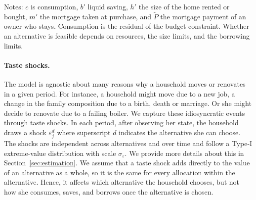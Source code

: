\begin{table}[!htbp]
\begin{threeparttable}
\begin{tabularx}{\textwidth}{@{}Xc@{}}
      \bottomrule\bottomrule
    \end{tabularx}
    \begin{tablenotes}[flushleft]\footnotesize
      \item Notes: $c$ is consumption, $b'$ liquid saving, $h'$ the size of
      the home rented or bought, $m'$ the mortgage taken at purchase, and
      $\widetilde P$ the mortgage payment of an owner who stays. Consumption is
      the residual of the budget constraint. Whether an alternative is
      feasible depends on resources, the size limits, and the borrowing
      limits.
    \end{tablenotes}
  \end{threeparttable}
\end{table}


\paragraph{Taste shocks.}
The model is agnostic about many reasons why a household moves or renovates in a
given period. For instance, a household might move due to a new job, a change in the family composition due to a birth, death or marriage. Or she might decide to renovate due to a  failing boiler. We capture these idiosyncratic events through taste shocks. In each period, after observing her state, the household draws a shock $\varepsilon_j^d$ where superscript $d$ indicates the alternative she can choose. The shocks are independent across alternatives and over time and follow a
Type-I extreme-value distribution with scale $\sigma_\varepsilon$. We provide more details about this in  Section~\ref{sec:estimation}. We assume that a taste shock adds directly to the value of an
alternative as a whole, so it is the same for every allocation within the alternative. Hence, it affects which alternative the household chooses, but not how she consumes, saves, and borrows once the alternative is chosen.

